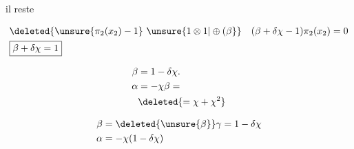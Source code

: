 il reste 

\[
\begin{aligned}
&\deleted{\unsure{\pi_2(x_2)-1}\ \unsure{1\otimes1|\oplus(\beta}}\quad(\beta+\delta\chi-1)\pi_2(x_2)=0\\
&\boxed{\beta+\delta\chi=1}
\end{aligned}
\]

\[
\begin{aligned}\beta&=1-\delta\chi.\\
\alpha&=-\chi\beta=\\ &\deleted{=\chi+\chi^2}\end{aligned}
\]

\[
\begin{aligned}\beta&=\deleted{\unsure{\beta}}\gamma=1-\delta\chi\\
\alpha&=-\chi(1-\delta\chi)\end{aligned}
\]
